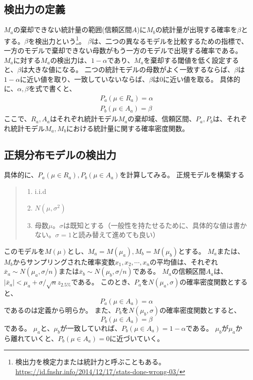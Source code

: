 \subsection{検出力の定義}
$M_a$の棄却できない統計量の範囲(信頼区間$A$)に$M_b$の統計量が出現する確率を$\beta$とする。$\beta$を検出力という\footnote{検出力を検定力または統計力と呼ぶこともある。\\ \url{https://id.fnshr.info/2014/12/17/stats-done-wrong-03/}}。
$\beta$は、二つの異なるモデルを比較するための指標で、一方のモデルで棄却できない母数がもう一方のモデルで出現する確率である。
$M_a$に対する$M_a$の検出力は、$1-\alpha$であり、$M_a$を棄却する閾値を低く設定すると、$\beta$は大きな値になる。
二つの統計モデルの母数がよく一致するならば、$\beta$は$1-\alpha$に近い値を取り、一致していないならば、$\beta$は0に近い値を取る。
具体的に、$\alpha,\beta$を式で書くと、
\begin{eqnarray*}
    P_a(\mu \in R_a) = \alpha\\
    P_b(\mu \in A_a) = \beta
\end{eqnarray*}
ここで、$R_a,A_a$はそれぞれ統計モデル$M_a$の棄却域、信頼区間、$P_a,P_b$は、それぞれ統計モデル$M_a,M_b$における統計量に関する確率密度関数。

\subsection{正規分布モデルの検出力}
具体的に、$P_a(\mu \in R_a),P_b(\mu\in A_a)$を計算してみる。
正規モデルを構築する
\begin{quote}
    \begin{enumerate}[(1)]
\item i.i.d
\item $N(\mu,\sigma^2)$
\item 母数$\mu$。$\sigma$は既知とする（一般性を持たせるために、具体的な値は書かない。$\sigma=1$と読み替えて進めても良い）
\end{enumerate}
\end{quote}
このモデルを$M(\mu)$とし、$M_a=M(\mu_a),M_b=M(\mu_b)$とする。
$M_a$または、$M_b$からサンプリングされた確率変数$x_1,x_2,\cdots,x_n$の平均値は、それぞれ$\bar{x}_a\sim N(\mu_a,\sigma/n)$または$\bar{x}_b\sim N(\mu_b,\sigma/n)$である。
$M_a$の信頼区間$A_a$は、$|\bar{x}_a|<\mu_a+\sigma / \sqrt{n}z_{2.5\%}$である。
このとき、$P_a$を$N(\mu_a,\sigma)$の確率密度関数とすると、
\begin{equation*}
    P_a(\mu \in A_a) = \alpha
\end{equation*}
であるのは定義から明らか。
また、$P_b$を$N(\mu_b,\sigma)$の確率密度関数とすると、
\begin{equation*}
    P_b(\mu \in A_a ) = \beta
\end{equation*}
である。
$\mu_a$と、$\mu_b$が一致していれば、$P_b(\mu \in A_a ) = 1-\alpha$である。
$\mu_b$が$\mu_a$から離れていくと、$P_b(\mu \in A_a)=0$に近づいていく。


